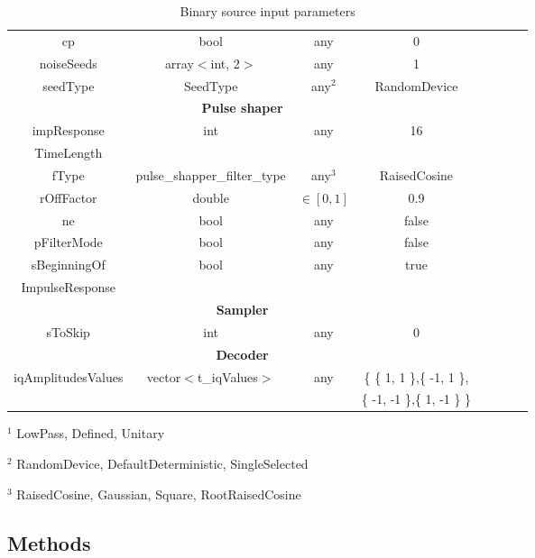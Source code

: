 \begin{table}[H]
\begin{tabular}{|c|c|c|c|cccc}
        cp & bool & any & 0 \\ \cline{1-4}
        noiseSeeds & array$<$int, 2$>$ & any & 1 \\ \cline{1-4}
        seedType & SeedType & any$^2$ & RandomDevice \\ \cline{1-4}
        \multicolumn{4}{|c|}{ \textbf{Pulse shaper} } \\ \cline{1-4}
        impResponse & int & any & 16 \\
        TimeLength & & & \\ \cline{1-4}
        fType   & pulse\_shapper\_filter\_type & any$^3$ & RaisedCosine \\ \cline{1-4}
        rOffFactor & double & $\in \left[0,1\right]$ & 0.9 \\ \cline{1-4}
        ne & bool & any & false \\ \cline{1-4}
        pFilterMode & bool & any & false \\ \cline{1-4}
        sBeginningOf & bool & any & true \\
        ImpulseResponse & & & \\ \cline{1-4}
        \multicolumn{4}{|c|}{ \textbf{Sampler} } \\ \cline{1-4}
        sToSkip & int & any & 0 \\ \cline{1-4}
        \multicolumn{4}{|c|}{ \textbf{Decoder} } \\ \cline{1-4}
        iqAmplitudesValues & vector$<$t\_iqValues$>$ & any & \{ \{ 1, 1 \},\{ -1, 1 \}, \\
        &&&\{ -1, -1 \},\{ 1, -1 \} \} \\ \cline{1-4}
	\end{tabular}
	\caption{Binary source input parameters}
	\label{table}
\end{table}
$^1$ LowPass, Defined, Unitary \par
$^2$ RandomDevice, DefaultDeterministic, SingleSelected \par
$^3$ RaisedCosine, Gaussian, Square, RootRaisedCosine \par

\subsection*{Methods}

